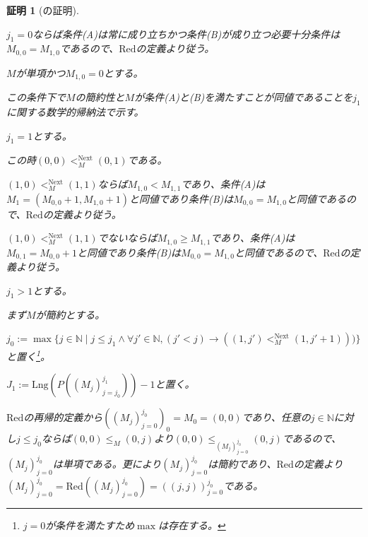 \documentclass[dvipdfmx,uplatex]{jsarticle}
\newif\iffull
\theoremstyle{customnonumberbreakfortheorem}
\theoremstyle{customnonumberbreakforproof}
\newtheorem{hideableproof}{証明}
\begin{document}
\iffull{それでは本題に戻る。}\fi

\begin{hideableproof}[の証明]
	\begin{indented}
		\item \(j_1 = 0\)ならば条件(A)は常に成り立ちかつ条件(B)が成り立つ必要十分条件は\(M_{0,0} = M_{1,0}\)であるので、\(\textrm{Red}\)の定義より従う。
		\item \(M\)が単項かつ\(M_{1,0} = 0\)とする。
		\begin{indented}
			\item この条件下で\(M\)の簡約性と\(M\)が条件(A)と(B)を満たすことが同値であることを\(j_1\)に関する数学的帰納法で示す。
			\item \(j_1 = 1\)とする。
			\begin{indented}
				\item この時\((0,0) <_M^{\textrm{Next}} (0,1)\)である。
				\item \((1,0) <_M^{\textrm{Next}} (1,1)\)ならば\(M_{1,0} < M_{1,1}\)であり、条件(A)は\(M_1 = (M_{0,0}+1,M_{1,0}+1)\)と同値であり条件(B)は\(M_{0,0} = M_{1,0}\)と同値であるので、\(\textrm{Red}\)の定義より従う。
				\item \((1,0) <_M^{\textrm{Next}} (1,1)\)でないならば\(M_{1,0} \geq M_{1,1}\)であり、条件(A)は\(M_{0,1} = M_{0,0}+1\)と同値であり条件(B)は\(M_{0,0} = M_{1,0}\)と同値であるので、\(\textrm{Red}\)の定義より従う。
			\end{indented}
			\item \(j_1 > 1\)とする。
			\begin{indented}
				\item まず\(M\)が簡約とする。
				\begin{indented}
					\item \(j_0 := \max \{j \in \mathbb{N} \mid j \leq j_1 \wedge \forall j' \in \mathbb{N}, (j' < j) \to ((1,j') <_M^{\textrm{Next}} (1,j'+1)))\}\)と置く\footnote{\(j = 0\)が条件を満たすため\(\max\)は存在する。}。
					\item \(J_1 := \textrm{Lng}(P((M_j)_{j=j_0}^{j_1}))-1\)と置く。
					\item \(\textrm{Red}\)の再帰的定義から\(((M_j)_{j=0}^{j_0})_0 = M_0 = (0,0)\)であり、任意の\(j \in \mathbb{N}\)に対し\(j \leq j_0\)ならば\((0,0) \leq_M (0,j)\)より\((0,0) \leq_{(M_j)_{j=0}^{j_0}} (0,j)\)であるので、\((M_j)_{j=0}^{j_0}\)は単項である。更により\((M_j)_{j=0}^{j_0}\)は簡約であり、\(\textrm{Red}\)の定義より\((M_j)_{j=0}^{j_0} = \textrm{Red}((M_j)_{j=0}^{j_0}) = ((j,j))_{j=0}^{j_0}\)である。

\end{indented}
\end{indented}
\end{indented}
\end{indented}
\end{hideableproof}
\end{document}
